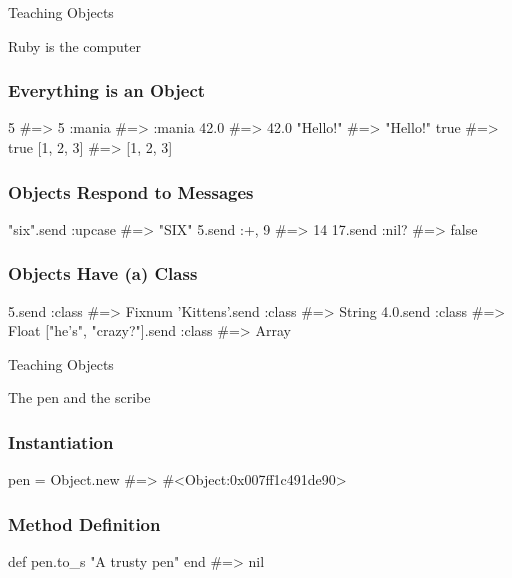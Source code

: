 \documentclass[20pt]{beamer}
\begin{document}
\begin{frame}
	\par{ Teaching Objects}
	\par\vspace{3cm}
	\pause \hfill{Ruby is the computer}
\end{frame}

\begin{frame}[fragile]
\frametitle{Everything is an Object}
\begin{rubycode}
5 #=> 5
:mania #=> :mania
42.0 #=> 42.0
"Hello!" #=> "Hello!"
true #=> true
[1, 2, 3] #=> [1, 2, 3]
\end{rubycode}
\end{frame}

\begin{frame}[fragile]
\frametitle{Objects Respond to Messages}
\begin{rubycode}
"six".send :upcase #=> "SIX"
5.send :+, 9 #=> 14
17.send :nil? #=> false
\end{rubycode}
\end{frame}

\begin{frame}[fragile]
\frametitle{Objects Have (a) Class}
\begin{rubycode}
5.send :class
#=> Fixnum
'Kittens'.send :class
#=> String
4.0.send :class
#=> Float
["he's", "crazy?"].send :class
#=> Array
\end{rubycode}
\end{frame}

\begin{frame}
	\par{ Teaching Objects}
	\par\vspace{3cm}
	\hfill{The pen and the scribe}
\end{frame}

\begin{frame}[fragile]
\frametitle{Instantiation}
\begin{rubycode}
pen = Object.new
#=> #<Object:0x007ff1c491de90>
\end{rubycode}
\end{frame}

\begin{frame}[fragile]
\frametitle{Method Definition}
\begin{rubycode}
def pen.to_s
"A trusty pen"
end
#=> nil
\end{rubycode}
\end{frame}
\end{document}
